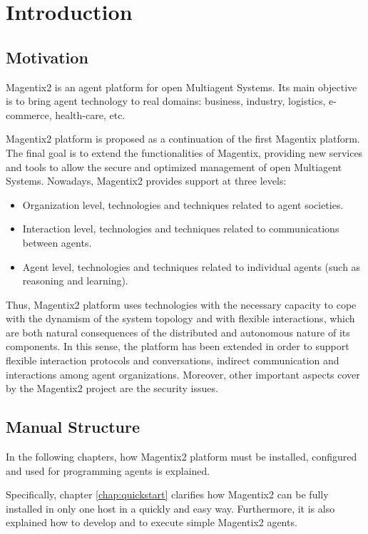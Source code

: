 \chapter{Introduction}
\section{Motivation}
Magentix2 is an agent platform for open Multiagent Systems. Its main objective is to bring agent technology to real domains: business, industry, logistics, e-commerce, health-care, etc.

Magentix2 platform is proposed as a continuation of the first Magentix platform. The final goal is to extend the functionalities of Magentix, providing new services and tools to allow the secure and optimized management of open Multiagent Systems. Nowadays, Magentix2 provides support at three levels: 

\begin{itemize}
	\item Organization level, technologies and techniques related to agent societies.
  \item Interaction level, technologies and techniques related to communications between agents.
 \item Agent level, technologies and techniques related to individual agents (such as reasoning and learning).
\end{itemize}

Thus, Magentix2 platform uses technologies with the necessary capacity  to cope with the  dynamism of the system topology and with flexible interactions, which are both natural consequences of the distributed and autonomous nature of its components. In this sense, the platform has been extended in order to support flexible interaction protocols and conversations, indirect communication and interactions among agent organizations. Moreover, other important aspects cover by the Magentix2 project are the security issues.

 


\section{Manual Structure}

In the following chapters, how Magentix2 platform must be installed, configured and used for programming agents is explained. 

Specifically, chapter \ref{chap:quickstart} clarifies how Magentix2 can be fully installed in only one host in a quickly and easy way. Furthermore, it is also explained how to develop and to execute simple Magentix2 agents. 

